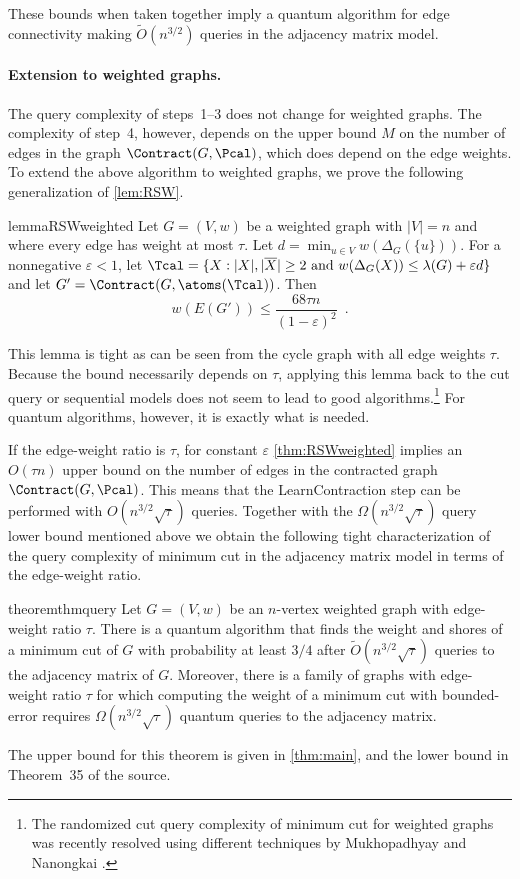 These bounds when taken together imply a quantum algorithm for edge connectivity making $\tilde O(n^{3/2})$ queries in the adjacency matrix model.

\paragraph*{Extension to weighted graphs.}
The query complexity of steps~1--3 does not change for weighted graphs.  The complexity of step~4, however, depends on the upper bound $M$ on the number of 
edges in the graph $\Contract(G, \Pcal)$, which does depend on the edge weights.
To extend the above algorithm to weighted graphs, we prove the following generalization of \cref{lem:RSW}.
\begin{restatable}{lemma}{RSWweighted}
\label{thm:RSWweighted}
Let $G = (V,w)$ be a weighted graph with $|V| =n$ and where every edge has weight at most $\tau$.  Let $d = \min_{u \in V} w(\Delta_G(\{u\}))$.  For a nonnegative $\varepsilon < 1$, let 
$\Tcal = \{X : |X|, |\overline{X}| \ge 2 \mbox{ and } w(\Delta_G(X)) \le \lambda(G) + \varepsilon d\}$ and let $G' = \Contract(G, \atoms(\Tcal))$.  Then 
\[
w(E(G')) \le \frac{68 \tau n}{(1-\varepsilon)^2} \enspace .
\]
\end{restatable}
This lemma is tight as can be seen from the cycle graph with all edge weights $\tau$.  Because the bound necessarily depends on $\tau$, applying this lemma 
back to the cut query or sequential models does not seem to lead to good algorithms.\footnote{The randomized cut query complexity of minimum cut for weighted graphs was 
recently resolved using different techniques by Mukhopadhyay and Nanongkai \cite{MN20}.}
For quantum algorithms, however, it is exactly what is needed.

If the edge-weight ratio is $\tau$, for constant $\varepsilon$ \cref{thm:RSWweighted} implies an $O(\tau n)$ upper bound on the number of edges in the contracted graph $\Contract(G,\Pcal)$.
This means that the LearnContraction step can be performed with $O(n^{3/2}\sqrt{\tau})$ queries.  Together with the $\Omega(n^{3/2}\sqrt{\tau})$ query lower bound mentioned 
above we obtain the following tight characterization of 
the query complexity of minimum cut in the adjacency matrix model in terms of the edge-weight ratio.


\begin{restatable}{theorem}{thmquery} \label{thm:restate_main}
Let $G =(V,w)$ be an $n$-vertex weighted graph with edge-weight ratio $\tau$.  There is a quantum algorithm that finds the 
weight and shores of a minimum cut of $G$ with probability at least $3/4$ after 
$\tilde O(n^{3/2}\sqrt{\tau})$ queries to the adjacency matrix of $G$.  Moreover, there is a family of graphs with edge-weight ratio $\tau$ 
for which computing the weight of a minimum cut with bounded-error requires $\Omega(n^{3/2} \sqrt{\tau})$ quantum queries to the adjacency matrix.
\end{restatable}
The upper bound for this theorem is given in \cref{thm:main}, and the lower bound in Theorem~35 of the source.


